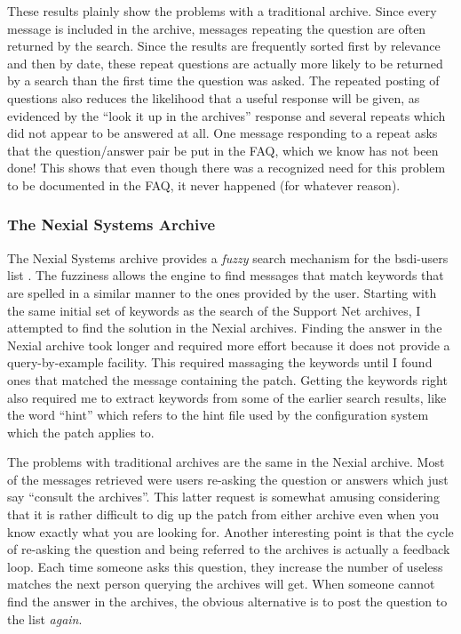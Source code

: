 These results plainly show the problems with a traditional archive. Since every
message is included in the archive, messages repeating the question are often
returned by the search. Since the results are frequently sorted first by
relevance and then by date, these repeat questions are actually more likely to
be returned by a search than the first time the question was asked. The
repeated posting of questions also reduces the likelihood that a useful
response will be given, as evidenced by the ``look it up in the archives''
response and several repeats which did not appear to be answered at all. One
message responding to a repeat asks that the question/answer pair be put in the
FAQ, which we know has not been done! This shows that even though there was a
recognized need for this problem to be documented in the FAQ, it never happened
(for whatever reason).

\subsubsection{The Nexial Systems Archive}
The Nexial Systems archive provides a {\em fuzzy} search mechanism for the
bsdi-users list \cite{nexial-bsdi}. The fuzziness allows the engine to find
messages that match keywords that are spelled in a similar manner to the ones
provided by the user. Starting with the same initial set of keywords as the
search of the Support Net archives, I attempted to find the solution in the
Nexial archives. Finding the answer in the Nexial archive took longer and
required more effort because it does not provide a query-by-example facility.
This required massaging the keywords until I found ones that matched the
message containing the patch. Getting the keywords right also required me to
extract keywords from some of the earlier search results, like the word
``hint'' which refers to the hint file used by the configuration system which
the patch applies to.

The problems with traditional archives are the same in the Nexial archive. Most
of the messages retrieved were users re-asking the question or answers which
just say ``consult the archives''. This latter request is somewhat amusing
considering that it is rather difficult to dig up the patch from either archive
even when you know exactly what you are looking for. Another interesting point
is that the cycle of re-asking the question and being referred to the archives
is actually a feedback loop. Each time someone asks this question, they
increase the number of useless matches the next person querying the archives
will get. When someone cannot find the answer in the archives, the obvious
alternative is to post the question to the list {\em again}.

